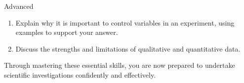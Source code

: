 \begin{tieredquestions}{Advanced}
\begin{enumerate}
    \item Explain why it is important to control variables in an experiment, using examples to support your answer.
    \item Discuss the strengths and limitations of qualitative and quantitative data.
\end{enumerate}
\end{tieredquestions}


Through mastering these essential skills, you are now prepared to undertake scientific investigations confidently and effectively.